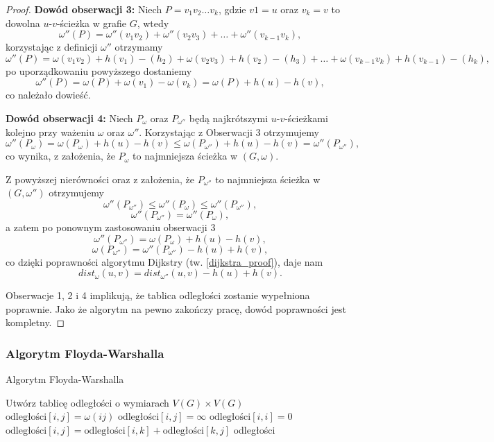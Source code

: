\begin{theorem}
\begin{proof}
		\textbf{Dowód obserwacji 3:} Niech $P=v_1v_2\dots v_k$, 
		gdzie $v1 = u$ oraz $v_k = v$ to dowolna $u$-$v$-ścieżka
		w grafie $G$, wtedy 
		\[\omega''(P) = \omega''(v_1v_2) + \omega''(v_2v_3) + \dots + \omega''(v_{k-1}v_k),\]
		korzystając z definicji $\omega''$ otrzymamy
		\[\omega''(P) = \omega(v_1v_2) + h(v_1) - (h_2) + 
		\omega(v_2v_3) + h(v_2) - (h_3) + 
		\dots + \omega(v_{k-1}v_k) + h(v_{k-1}) - (h_k),\]
		po uporządkowaniu powyższego dostaniemy
		\[\omega''(P) = \omega(P) + \omega(v_1) - \omega(v_k) = \omega(P) + h(u) - h(v),\]
		co należało dowieść.
		
		\textbf{Dowód obserwacji 4:} Niech $P_{\omega}$ oraz 
		$P_{\omega''}$ będą najkrótszymi $u$-$v$-ścieżkami kolejno 
		przy ważeniu $\omega$ oraz $\omega''$. Korzystając z 
		Obserwacji 3 otrzymujemy
		\[\omega''(P_{\omega}) = \omega(P_{\omega}) + h(u) - h(v) \leq
		\omega(P_{\omega''}) + h(u) - h(v) = \omega''(P_{\omega''}),\]
		co wynika, z założenia, że $P_{\omega}$ to 
		najmniejsza ścieżka w $(G, \omega)$. 
		
		Z powyższej nierówności oraz z założenia, że $P_{\omega''}$ to 
		najmniejsza ścieżka w $(G, \omega'')$ otrzymujemy
		\[\omega''(P_{\omega''}) \leq \omega''(P_{\omega}) \leq \omega''(P_{\omega''}), \]
		\[\omega''(P_{\omega''}) = \omega''(P_{\omega}),\]
		a zatem po ponownym zastosowaniu obserwacji 3
		\[\omega''(P_{\omega''}) = \omega(P_{\omega}) + h(u) - h(v),\]
		\[\omega(P_{\omega''}) = \omega''(P_{\omega''}) - h(u) + h(v),\]
		co dzięki poprawności algorytmu Dijkstry (tw. \ref{dijkstra_proof}),
		daje nam
		\[dist_{\omega}(u, v) = dist_{\omega''}(u, v) - h(u) + h(v).\]
		
		Obserwacje 1, 2 i 4 implikują, że tablica odległości zostanie
		wypełniona poprawnie. Jako że algorytm na pewno zakończy pracę,
		dowód poprawności jest kompletny.
	\end{proof} 
\end{theorem}

\subsubsection{Algorytm Floyda-Warshalla}
\begin{algorithm}[H]
	\caption{Algorytm Floyda-Warshalla}
	\begin{algorithmic}[1]
		\State Utwórz tablicę odległości o wymiarach $V(G) \times V(G)$
		\State $\text{odległości}[i, j] = \omega(ij)$
		\Else
		\State $\text{odległości}[i, j] = \infty$
		\EndIf
		\EndFor
		\EndFor
		\State $\text{odległości}[i, i] = 0$
		\EndFor
		\State $\text{odległości}[i, j] = \text{odległości}[i, k] + \text{odległości}[k, j]$
		\EndIf
		\EndFor
		\EndFor
		\EndFor
		\State \Return odległości
		\EndProcedure
	\end{algorithmic}
	\label{floydWarshall_alg}
\end{algorithm}

